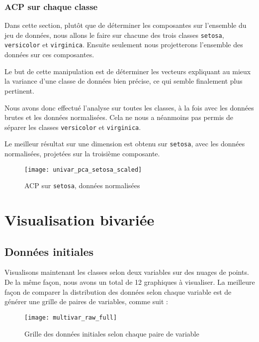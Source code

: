\documentclass[french]{report}
\begin{document}
    \subsection{ACP sur chaque classe}
    
    Dans cette section, plutôt que de déterminer les composantes sur l'ensemble du jeu de données, nous allons le faire sur chacune des trois classes \texttt{setosa}, \texttt{versicolor} et \texttt{virginica}.
    Ensuite seulement nous projetterons l'ensemble des données sur ces composantes.
    
    Le but de cette manipulation est de déterminer les vecteurs expliquant au mieux la variance d'une classe de données bien précise, ce qui semble finalement plus pertinent.
    
    Nous avons donc effectué l'analyse sur toutes les classes, à la fois avec les données brutes et les données normalisées.
    Cela ne nous a néanmoins pas permis de séparer les classes \texttt{versicolor} et \texttt{virginica}.
    
    Le meilleur résultat sur une dimension est obtenu sur \texttt{setosa}, avec les données normalisées, projetées sur la troisième composante.
    
    \begin{figure}[h]
        \centering
        \texttt{[image: univar\_pca\_setosa\_scaled]}
        \caption{ACP sur \texttt{setosa}, données normalisées}
    \end{figure}
    
    
    \chapter{Visualisation bivariée}
    
    \section{Données initiales}
    
    Visualisons maintenant les classes selon deux variables sur des nuages de points.
    De la même façon, nous avons un total de 12 graphiques à visualiser.
    La meilleure façon de comparer la distribution des données selon chaque variable est de générer une grille de paires de variables, comme suit :
    
    \begin{figure}[h]
        \centering
        \texttt{[image: multivar\_raw\_full]}
        \caption{Grille des données initiales selon chaque paire de variable}
    \end{figure}
    
\end{document}
